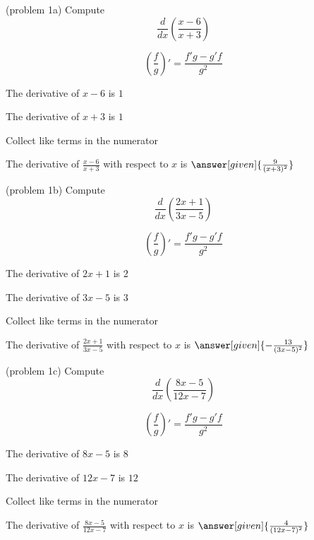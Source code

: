 \documentclass{ximera}
\begin{document}
\begin{problem}(problem 1a)
  Compute
  \[
  \frac{d}{dx} \left(\frac{x-6}{x+3}\right)
  \]
  
    \begin{hint}
      \[\left(\frac{f}{g}\right)' = \frac{f'g-g'f}{g^2}\]
    \end{hint}
    \begin{hint}
      The derivative of $x-6$ is $1$
    \end{hint}
    \begin{hint}
      The derivative of $x+3$ is $1$
    \end{hint}
    \begin{hint}
      Collect like terms in the numerator
    \end{hint}
		The derivative of $\frac{x-6}{x+3}$ with respect to $x$ is
		 $\answer[given]{\frac{9}{(x+3)^2}}$
		
\end{problem}


\begin{problem}(problem 1b)
  Compute
  \[
  \frac{d}{dx} \left(\frac{2x+1}{3x-5}\right)
  \]
  
    \begin{hint}
      \[\left(\frac{f}{g}\right)' = \frac{f'g-g'f}{g^2}\]
    \end{hint}
    \begin{hint}
      The derivative of $2x+1$ is $2$
    \end{hint}
    \begin{hint}
      The derivative of $3x-5$ is $3$
    \end{hint}
    \begin{hint}
      Collect like terms in the numerator
    \end{hint}
		The derivative of $\frac{2x+1}{3x-5}$ with respect to $x$ is
		 $\answer[given]{-\frac{13}{(3x-5)^2}}$
		
\end{problem}


\begin{problem}(problem 1c)
  Compute
  \[
  \frac{d}{dx} \left(\frac{8x-5}{12x - 7}\right)
  \]
  
    \begin{hint}
      \[\left(\frac{f}{g}\right)' = \frac{f'g-g'f}{g^2}\]
    \end{hint}
    \begin{hint}
      The derivative of $8x-5$ is $8$
    \end{hint}
    \begin{hint}
      The derivative of $12x-7$ is $12$
    \end{hint}
    \begin{hint}
      Collect like terms in the numerator
    \end{hint}
		The derivative of $\frac{8x-5}{12x-7}$ with respect to $x$ is
		 $\answer[given]{\frac{4}{(12x-7)^2}}$
		
\end{problem}
\end{document}
